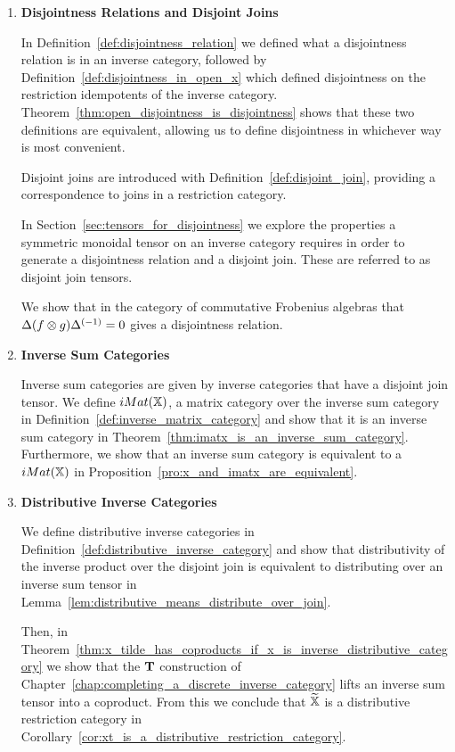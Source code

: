 \begin{enumerate}
\item \textbf{Disjointness Relations and Disjoint Joins}

In Definition~\ref{def:disjointness_relation} we defined what a disjointness relation is in an
inverse category, followed by Definition~\ref{def:disjointness_in_open_x} which defined disjointness
on the restriction idempotents of the inverse
category. Theorem~\ref{thm:open_disjointness_is_disjointness} shows that these two definitions are
equivalent, allowing us to define disjointness in whichever way is most convenient.

Disjoint joins are introduced with Definition~\ref{def:disjoint_join}, providing a correspondence to
joins in a restriction category.

In Section~\ref{sec:tensors_for_disjointness} we explore the properties a symmetric monoidal tensor
on an inverse category requires in order to generate a disjointness relation and a disjoint
join. These are referred to as disjoint join tensors.

We show that in the category of commutative Frobenius algebras that $\Delta(f\otimes g){\Delta}^{(-1)} = 0$
gives a disjointness relation.

\item \textbf{Inverse Sum Categories}

Inverse sum categories are given by inverse categories that have a disjoint join tensor. We define
$iMat({\mathbb{X}})$, a matrix category over the inverse sum category \X in
Definition~\ref{def:inverse_matrix_category} and show that it is an inverse sum category in
Theorem~\ref{thm:imatx_is_an_inverse_sum_category}. Furthermore, we show
that an inverse sum category \X is equivalent to a $iMat({\mathbb{X}})$ in
Proposition~\ref{pro:x_and_imatx_are_equivalent}.


\item \textbf{Distributive Inverse Categories}

We define distributive inverse categories in Definition~\ref{def:distributive_inverse_category} and
show that distributivity of the inverse product over the disjoint join is equivalent to distributing
over an inverse sum tensor in Lemma~\ref{lem:distributive_means_distribute_over_join}.

Then, in Theorem~\ref{thm:x_tilde_has_coproducts_if_x_is_inverse_distributive_category} we show that
the $\mathbf{T}$ construction of Chapter~\ref{chap:completing_a_discrete_inverse_category} lifts an inverse sum
tensor into a coproduct. From this we conclude that $\widetilde{\mathbb{X}}$ is a distributive restriction category in
Corollary~\ref{cor:xt_is_a_distributive_restriction_category}.
\end{enumerate}

